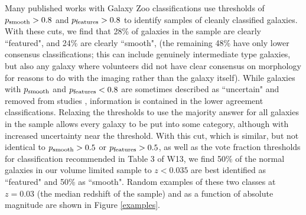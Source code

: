 \documentclass[usenatbib]{mn2e}
\begin{document}
 Many published works with Galaxy Zoo classifications use thresholds of $p_{\rm smooth}>0.8$ and $p_{\rm features}>0.8$ to identify samples of cleanly classified galaxies. With these cuts, we find that {28\%} of galaxies in the sample are clearly ``featured", and {24\%} are clearly ``smooth", (the remaining 48\% have only lower consensus classifications; this can include genuinely intermediate type galaxies, but also any galaxy where volunteers did not have clear consensus on morphology for reasons to do with the imaging rather than the galaxy itself). While galaxies with $p_{\rm smooth}$ and $p_{\rm features}<0.8$ are sometimes described as ``uncertain" and removed from studies \citep[e.g.][]{Schawinski2014}, information is contained in the lower agreement classifications. Relaxing the thresholds to use the majority answer for all galaxies in the sample allows every galaxy to be put into some category, although with increased uncertainty near the threshold. With this cut, which is similar, but not identical to  $p_{\rm smooth}>0.5$ or $p_{\rm features}>0.5$, as well as the vote fraction thresholds for classification recommended in Table 3 of W13, we find {50\%} of the normal galaxies in our volume limited sample to $z<0.035$ are best identified as ``featured" and {50\%} as ``smooth". Random examples of these two classes at $z=0.03$ (the median redshift of the sample) and as a function of absolute magnitude are shown in Figure \ref{examples}. %
 
\end{document}
